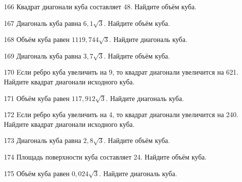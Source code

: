 \begin{taskBN}{166}
Квадрат диагонали куба составляет 48. Найдите объём куба.
\end{taskBN}

\begin{taskBN}{167}
Диагональ куба равна $6,1\sqrt{3}$. Найдите объём куба.
\end{taskBN}

\begin{taskBN}{168}
Объём куба равен $1119,744\sqrt{3}$. Найдите диагональ куба.
\end{taskBN}

\begin{taskBN}{169}
Диагональ куба равна $3,7\sqrt{3}$. Найдите объём куба.
\end{taskBN}

\begin{taskBN}{170}
Eсли ребро куба увеличить на 9, то квадрат диагонали увеличится на 621. Найдите квадрат диагонали исходного куба.
\end{taskBN}

\begin{taskBN}{171}
Объём куба равен $117,912\sqrt{3}$. Найдите диагональ куба.
\end{taskBN}

\begin{taskBN}{172}
Eсли ребро куба увеличить на 4, то квадрат диагонали увеличится на 240. Найдите квадрат диагонали исходного куба.
\end{taskBN}

\begin{taskBN}{173}
Диагональ куба равна $2,8\sqrt{3}$. Найдите объём куба.
\end{taskBN}

\begin{taskBN}{174}
Площадь поверхности куба составляет 24. Найдите объём куба.
\end{taskBN}

\begin{taskBN}{175}
Объём куба равен $0,024\sqrt{3}$. Найдите диагональ куба.
\end{taskBN}

